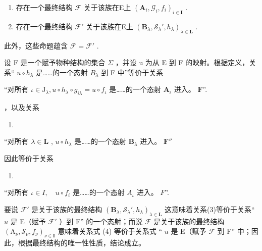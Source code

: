 \begin{enumerate}
\def\labelenumi{(\alph{enumi})}
\item
  存在一个最终结构 \(\mathcal{F}\) 关于该族在E上 \((\mathbf{A}_i, \mathcal{G}_i, f_i)_{i \in \mathbf{I}}\) .
\item
  存在一个最终结构 \(\mathcal{F}'\) 关于该族在E上 \((\mathbf{B}_{\lambda}, \mathcal{S}_{\lambda}', h_{\lambda})_{\lambda \in \mathbf{L}}\) .
\end{enumerate}

此外，这些命题蕴含 \(\mathcal{F} = \mathcal{F}'\) .

设 F 是一个赋予物种结构的集合 \(\Sigma\) ，并设 u 为从 E 到 F 的映射。根据定义，关系“ \(u \circ h_{\lambda}\) 是……的一个态射 \(B_{\lambda}\) 到 F 中”等价于关系

``对所有 \(\iota\in\mathrm{J}_{\lambda}, u\circ h_{\lambda}\circ g_{i\lambda}=u\circ f_{\iota}\) 是……的一个态射 \(\mathbf{A}_{\iota}\) 进入。 \(\mathbf{F}\)''.

，以及关系

\begin{enumerate}
\def\labelenumi{(\arabic{enumi})}
\setcounter{enumi}{2}
\tightlist
\item
\end{enumerate}

``对所有 \(\lambda \in \mathbf{L}\) , \(u \circ h_{\lambda}\) 是……的一个态射 \(\mathbf{B}_{\lambda}\) 进入。 \(\mathbf{F}''\)

因此等价于关系

\begin{enumerate}
\def\labelenumi{(\arabic{enumi})}
\setcounter{enumi}{3}
\tightlist
\item
\end{enumerate}

``对所有 \(\iota\in I,\quad u\circ f_{i}\) 是……的一个态射 \(A_{\iota}\) 进入。 \(F\)''.

要说 \(\mathcal{F}'\) 是关于该族的最终结构 \((\mathbf{B}_{\lambda},\mathcal{S}_{\lambda}',h_{\lambda})_{\lambda \in \mathbf{L}}\) 这意味着关系(3)等价于关系“ \(u\) 是 E（赋予 \(\mathcal{F}'\) ）到 F'' 的一个态射；而说 \(\mathcal{F}\) 是关于该族的最终结构 \((\mathrm{A}_{\nu},\mathcal{S}_{\nu},f_{\nu})_{\nu \in \mathbf{I}}\) 意味着关系式 (4) 等价于关系式 “ \(u\) 是 E（赋予 \(\mathcal{F}\) 到 F'' 中；因此，根据最终结构的唯一性性质，结论成立。

